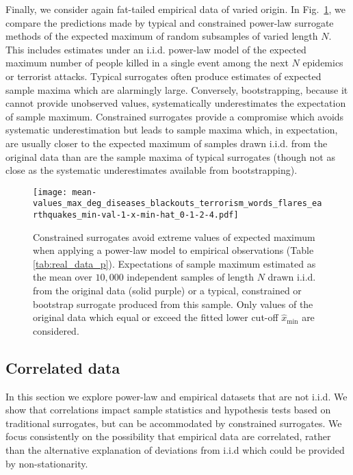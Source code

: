 \documentclass[%
prx,
reprint,
superscriptaddress,
nofootinbib,
 amsmath,amssymb,
 aps,
floatfix,
]{revtex4-2}
\begin{document}
Finally, we consider again fat-tailed empirical data of varied origin. In Fig.~\ref{fig:max_real_data_sets}, we compare the predictions made by typical and constrained power-law surrogate methods of the expected maximum of random subsamples of varied length $N$. This includes estimates under an i.i.d. power-law model of the expected maximum number of people killed in a single event among the next $N$ epidemics or terrorist attacks. Typical surrogates often produce estimates of expected sample maxima which are alarmingly large. Conversely, bootstrapping, because it cannot provide unobserved values, systematically underestimates the expectation of sample maximum. Constrained surrogates provide a compromise which avoids systematic underestimation but leads to sample maxima which, in expectation, are usually closer to the expected maximum of samples drawn i.i.d. from the original data than are the sample maxima of typical surrogates (though not as close as the systematic underestimates available from bootstrapping).

\begin{figure}[htbp]
\texttt{[image: mean-values\_max\_deg\_diseases\_blackouts\_terrorism\_words\_flares\_earthquakes\_min-val-1-x-min-hat\_0-1-2-4.pdf]}
\caption{
Constrained surrogates avoid extreme values of expected maximum when applying a power-law model to empirical observations (Table \ref{tab:real_data_p}). Expectations of sample maximum estimated as the mean over $10,000$ independent samples of length $N$ drawn i.i.d. from the original data (solid purple) or a typical, constrained or bootstrap surrogate produced from this sample. Only values of the original data which equal or exceed the fitted lower cut-off $\hat{x}_{\min}$ are considered. %
}
\label{fig:max_real_data_sets}
\end{figure}

\subsection{Correlated data}
In this section we explore power-law and empirical datasets that are not i.i.d. We show that correlations impact sample statistics and hypothesis tests based on traditional surrogates, but can be accommodated by constrained surrogates. We focus consistently on the possibility that empirical data are correlated, rather than the alternative explanation of deviations from i.i.d which could be provided by non-stationarity.
\end{document}
